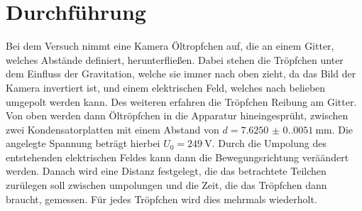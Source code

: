 \section{Durchführung}
Bei dem Versuch nimmt eine Kamera Öltropfchen auf, die an einem Gitter, welches Abstände definiert, herunterfließen.
Dabei stehen die Tröpfchen unter dem Einfluss der Gravitation, welche sie immer nach oben zieht,
da das Bild der Kamera invertiert ist, und einem elektrischen Feld, welches nach belieben umgepolt werden kann. 
Des weiteren erfahren die Tröpfchen Reibung am Gitter. Von oben werden dann Öltröpfchen in die Apparatur 
hineingesprüht, zwischen zwei Kondensatorplatten mit einem Abstand von $d=\qty{7.6250(0.0051)}{\milli\meter}$. 
Die angelegte Spannung beträgt hierbei $U_0=\qty{249}{\volt}$. Durch die Umpolung des entstehenden elektrischen
Feldes kann dann die Bewegungsrichtung veräändert werden. Danach wird eine Distanz festgelegt, die das betrachtete
Teilchen zurülegen soll zwischen umpolungen und die Zeit, die das Tröpfchen dann braucht, gemessen. Für jedes Tröpfchen
wird dies mehrmals wiederholt.
\label{sec:Durchführung}
